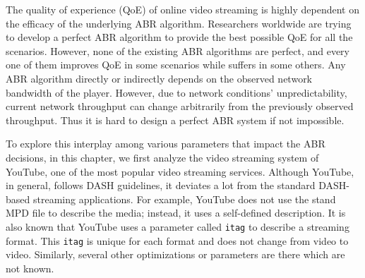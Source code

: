 
The quality of experience (QoE) of online video streaming is highly dependent on the efficacy of the underlying ABR algorithm. Researchers worldwide are trying to develop a perfect ABR algorithm to provide the best possible QoE for all the scenarios. However, none of the existing ABR algorithms are perfect, and every one of them improves QoE in some scenarios while suffers in some others. Any ABR algorithm directly or indirectly depends on the observed network bandwidth of the player. However, due to network conditions' unpredictability, current network throughput can change arbitrarily from the previously observed throughput. Thus it is hard to design a perfect ABR system if not impossible. 

To explore this interplay among various parameters that impact the ABR decisions, in this chapter, we first analyze the video streaming system of YouTube, one of the most popular video streaming services. Although YouTube, in general, follows DASH guidelines, it deviates a lot from the standard DASH-based streaming applications. For example, YouTube does not use the stand MPD file to describe the media; instead, it uses a self-defined description. It is also known that YouTube uses a parameter called {\tt itag} to describe a streaming format. This {\tt itag} is unique for each format and does not change from video to video. Similarly, several other optimizations or parameters are there which are not known. 


